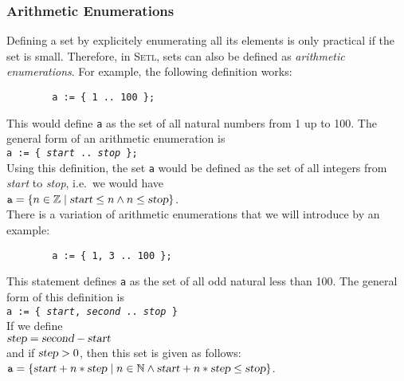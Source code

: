 \subsubsection{Arithmetic Enumerations}
Defining a set by explicitely enumerating all its elements is only practical if the set
is small.  Therefore, in \textsc{Setl}, sets can also be defined  as 
 \emph{arithmetic enumerations}.  For example, the following definition works: 
\begin{verbatim}
        a := { 1 .. 100 };
\end{verbatim}
This would define \texttt{a} as the set of all natural numbers from 1 up to 100.
The general form of an arithmetic enumeration is \\[0.2cm]
\hspace*{1.3cm} \texttt{a := \{ \textsl{start} .. \textsl{stop} \};} \\[0.2cm]
Using this definition, the set  \texttt{a} would be defined as the set of all integers
from \textsl{start} to \textsl{stop}, i.e.~we would have \\[0.2cm]
\hspace*{1.3cm} $\texttt{a} = \{ n \in \mathbb{Z} \mid \textsl{start} \leq n \wedge n
\leq\textsl{stop} \}$. 
\\[0.2cm]
There is a variation of arithmetic enumerations that we will introduce by an example:
\begin{verbatim}
        a := { 1, 3 .. 100 };
\end{verbatim}
This statement defines \texttt{a} as the set of all odd natural less than 100.
The general form of this definition is \\[0.2cm]
\hspace*{1.3cm} 
\texttt{a := \{ \textsl{start}, \textsl{second} .. \textsl{stop} \}} \\[0.2cm]
If we define
\\[0.2cm]
\hspace*{1.3cm}
 $\textsl{step} = \textsl{second} - \textsl{start}$ 
\\[0.2cm]
and if $\textsl{step} > 0$, then this set is given as follows: \\[0.2cm]
\hspace*{1.3cm} $\texttt{a} = \{ \textsl{start} + n * \textsl{step} \mid n \in \mathbb{N} \wedge \textsl{start} + n * \textsl{step} \leq\textsl{stop} \}$. 

